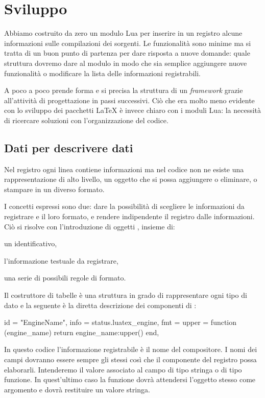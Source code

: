\section{Sviluppo}

Abbiamo costruito da zero un modulo Lua per inserire in un registro alcune
informazioni sulle compilazioni dei sorgenti. Le funzionalità sono minime ma si
tratta di un buon punto di partenza per dare risposta a nuove domande: quale
struttura dovremo dare al modulo in modo che sia semplice aggiungere nuove
funzionalità o modificare la lista delle informazioni registrabili.

A poco a poco prende forma e si precisa la struttura di un \emph{framework}
grazie all'attività di progettazione in passi successivi. Ciò che era molto meno
evidente con lo sviluppo dei pacchetti \LaTeX{} è invece chiaro con i moduli
Lua: la necessità di ricercare soluzioni con l'organizzazione del codice.


\subsection{Dati per descrivere dati}

Nel registro ogni linea contiene informazioni ma nel codice non ne esiste una
rappresentazione di alto livello, un oggetto che si possa aggiungere o
eliminare, o stampare in un diverso formato.

I concetti espressi sono due: dare la possibilità di scegliere le informazioni
da registrare e il loro formato, e rendere indipendente il registro dalle
informazioni. Ciò si risolve con l'introduzione di oggetti , insieme
di:
\begin{compactitemize}
\item un identificativo,
\item l'informazione testuale da registrare,
\item una serie di possibili regole di formato.
\end{compactitemize}

Il costruttore di tabelle è una struttura in grado di rappresentare ogni tipo di
dato e la seguente è la diretta descrizione dei componenti di :
\begin{lines}
{
    id = "EngineName",
    info = status.luatex_engine,
    fmt = {
        upper = function (engine_name)
            return engine_name:upper()
        end,
    }
}
\end{lines}

In questo codice l'informazione registrabile è il nome del compositore. I nomi
dei campi dovranno essere sempre gli stessi così che il componente del registro
possa elaborarli. Intenderemo il valore associato al campo  di tipo
stringa o di tipo funzione. In quest'ultimo caso la funzione dovrà attendersi
l'oggetto stesso come argomento e dovrà restituire un valore stringa.

